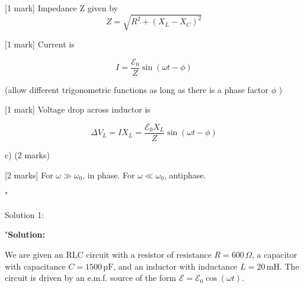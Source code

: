 [1 mark] Impedance Z given by 
\[ Z = \sqrt{R^2 + (X_L - X_C)^2} \]

[1 mark] Current is

\[ I =  \frac{\mathcal{E}_0}{Z} \sin(\omega t - \phi) \]

(allow different trigonometric functions as long as there is a phase factor \( \phi \) ) 

[1 mark] Voltage drop across inductor is 

\[ \Delta{V_L} = I X_L = \frac{\mathcal{E}_0 X_L}{Z} \sin(\omega t - \phi) \]

c) (2 marks)

[2 marks] For \( \omega \gg \omega_{0} \), in phase. For \( \omega \ll \omega_{0} \), antiphase.  

"

Solution 1:

"\textbf{Solution:}

We are given an RLC circuit with a resistor of resistance $R = 600 \, \Omega$, a capacitor with capacitance $C = 1500 \, \mathrm{pF}$, and an inductor with inductance $L = 20 \, \mathrm{mH}$. The circuit is driven by an e.m.f. source of the form $\mathcal{E} = \mathcal{E}_0 \cos(\omega t)$.

